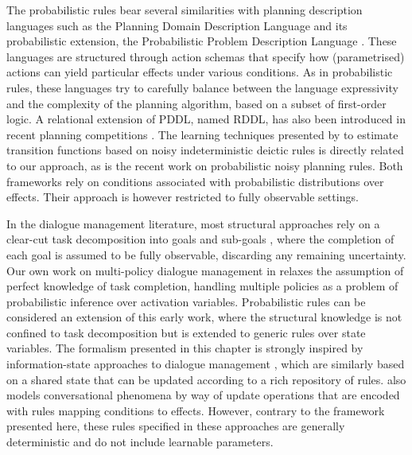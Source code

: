 The probabilistic rules bear several similarities with planning description languages such as the Planning Domain Description Language \citep[PDDL, see ][]{mcdermott1998} and its probabilistic extension, the Probabilistic Problem Description Language \citep[PPDDL, see ][]{younes2004ppddl1}.  These languages are structured through action schemas that specify how (parametrised) actions can yield particular effects under various conditions. As in probabilistic rules, these languages try to carefully balance between the language expressivity and the complexity of the planning algorithm, based on a subset of first-order logic. A relational extension of PDDL, named RDDL, has also been introduced in recent planning competitions \citep{Sanner:RDDL}. The learning techniques presented by \cite{PasulaZK07} to estimate transition functions based on noisy indeterministic deictic rules is directly related to our approach, as is the recent work \cite{lang10jair} on probabilistic noisy planning rules.   Both frameworks rely on conditions associated with probabilistic distributions over effects. Their approach is however restricted to fully observable settings. 

In the dialogue management literature, most structural approaches rely on a clear-cut task decomposition into goals and sub-goals \citep{Allen:2000:AGD:973935.973937,Steedman-Petrick:07,Bohus:2009:RDM:1518321.1518367}, where the completion of each goal is assumed to be fully observable, discarding any remaining uncertainty.  Our own work on multi-policy dialogue management in \cite{multipolicy-sigdial2011} relaxes the assumption of perfect knowledge of task completion, handling multiple policies as a problem of probabilistic inference over activation variables.  Probabilistic rules can be considered an extension of this early work, where the structural knowledge is not confined to task decomposition but is extended to generic rules over state variables.  The formalism presented in this chapter is strongly inspired by information-state approaches to dialogue management \citep{Larsson:2000,Bos2003}, which are similarly based on a shared state that can be updated according to a rich repository of rules.  \cite{Ginzburg2012} also models conversational phenomena by way of update operations that are encoded with rules mapping conditions to effects. However, contrary to the framework presented here, these rules specified in these approaches are generally deterministic and do not include learnable parameters. 
 
